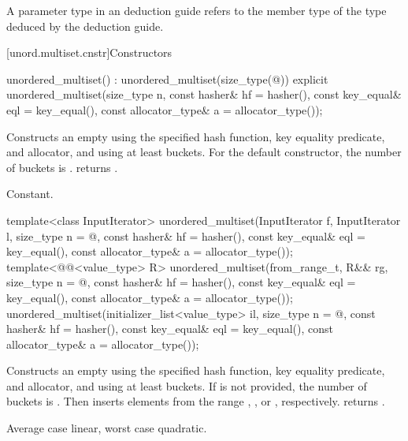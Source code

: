 \pnum
A  parameter type in an  deduction guide
refers to the  member type of
the type deduced by the deduction guide.

[unord.multiset.cnstr]{Constructors}

%
\begin{itemdecl}
unordered_multiset() : unordered_multiset(size_type(@\seebelow@)) { }
explicit unordered_multiset(size_type n,
                            const hasher& hf = hasher(),
                            const key_equal& eql = key_equal(),
                            const allocator_type& a = allocator_type());
\end{itemdecl}

\begin{itemdescr}
\pnum
\effects
Constructs an empty  using the
specified hash function, key equality predicate, and allocator, and
using at least  buckets.  For the default constructor,
the number of buckets is .
 returns .

\pnum
\complexity
Constant.
\end{itemdescr}

%
\begin{itemdecl}
template<class InputIterator>
  unordered_multiset(InputIterator f, InputIterator l,
                     size_type n = @\seebelow@,
                     const hasher& hf = hasher(),
                     const key_equal& eql = key_equal(),
                     const allocator_type& a = allocator_type());
template<@@<value_type> R>
  unordered_multiset(from_range_t, R&& rg,
                     size_type n = @\seebelow@,
                     const hasher& hf = hasher(),
                     const key_equal& eql = key_equal(),
                     const allocator_type& a = allocator_type());
unordered_multiset(initializer_list<value_type> il,
                   size_type n = @\seebelow@,
                   const hasher& hf = hasher(),
                   const key_equal& eql = key_equal(),
                   const allocator_type& a = allocator_type());
\end{itemdecl}

\begin{itemdescr}
\pnum
\effects
Constructs an empty  using the
specified hash function, key equality predicate, and allocator, and
using at least  buckets. If  is not
provided, the number of buckets is . Then
inserts elements from the range , , or ,
respectively.
 returns .

\pnum
\complexity
Average case linear, worst case quadratic.
\end{itemdescr}

